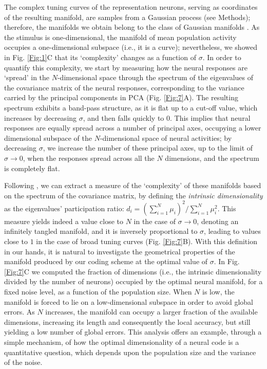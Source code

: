 \documentclass[a4paper]{article}%
\begin{document}
The complex tuning curves of the representation neurons, serving as coordinates of the resulting manifold, are samples from a  Gaussian process (see Methods); therefore, the manifolds we obtain belong to the class of Gaussian manifolds \cite[]{Lahiri2016RandomManifolds}. As the stimulus is one-dimensional, the manifold of mean population activity occupies a one-dimensional subspace (i.e., it is a curve); nevertheless, we showed in Fig. \ref{Fig:1}C that its `complexity' changes as a function of $\sigma$. In order to quantify this complexity, we start by measuring how the neural responses are `spread' in the $N$-dimensional space through the spectrum of the eigenvalues of the covariance matrix of the neural responses, corresponding to the variance carried by the principal components in PCA (Fig. \ref{Fig:7}A). The resulting spectrum exhibits a band-pass structure, as it is flat up to a cut-off value, which increases by decreasing $\sigma$, and then falls quickly to 0. This implies that neural responses are equally spread across a number of principal axes, occupying a lower dimensional subspace of the $N$-dimensional space of neural activities; by decreasing $\sigma$, we increase the number of these principal axes, up to the limit of $\sigma \rightarrow 0 $, when the responses spread across all the $N$ dimensions, and the spectrum is completely flat.

Following \cite{Gao2017AMeasurement}, we can extract a  measure of the `complexity' of these manifolds based on the spectrum of the covariance matrix, by defining the  \emph{intrinsic dimensionality} as the eigenvalues' participation ratio: $d_i = (\sum_{i=1}^N\mu_i)^2/\sum_{i=1}^N\mu_i^2$. This measure yields indeed a value close to $N$ in the case of $\sigma \rightarrow 0 $, denoting an infinitely tangled manifold, and it is inversely proportional to $\sigma$, leading to  values close to $1$ in the case of broad tuning curves (Fig. \ref{Fig:7}B).  With this definition in our hands, it is natural to investigate the geometrical properties of the manifold produced by our coding scheme at the optimal value of $\sigma$. In Fig. \ref{Fig:7}C we computed the fraction of dimensions (i.e., the intrinsic dimensionality divided by the number of neurons) occupied by the optimal neural manifold, for a fixed noise level, as a function of the population size. When $N$ is low, the manifold is forced to lie on a low-dimensional subspace in order to avoid global errors. As $N$ increases, the manifold can occupy a larger fraction of the available dimensions, increasing its length and consequently the local accuracy, but still yielding a low number of global errors. This analysis offers an example, through a simple mechanism, of how the optimal dimensionality of a neural code is a quantitative question, which depends upon the population size and the variance of the noise.
\end{document}
